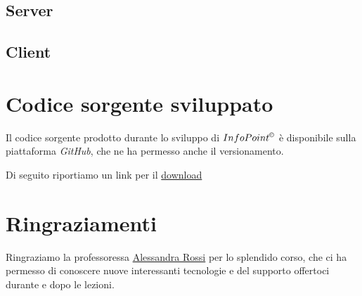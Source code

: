 \documentclass[letterpaper, 11pt]{article}
\begin{document}
\subsection{Server}
\label{Dettagli implementativi - Server}
\subsection{Client}
\label{Dettagli implementativi - Client}
\section{Codice sorgente sviluppato}
\label{Codice sorgente sviluppato}
Il codice sorgente prodotto durante lo sviluppo di \(InfoPoint^{\copyright}\) è disponibile sulla piattaforma \emph{GitHub}, che ne ha permesso anche il versionamento.

Di seguito riportiamo un link per il \href{https://github.com/luftmensch-luftmensch/InfoPoint/}{download} \autocite{informazioniRepository}
\section{Ringraziamenti}
\label{Ringraziamenti}
Ringraziamo la professoressa \href{mailto:alessandra.rossi@unina.it}{Alessandra Rossi} per lo splendido corso, che ci ha permesso di conoscere nuove interessanti tecnologie e del supporto offertoci durante e dopo le lezioni.
\end{document}
